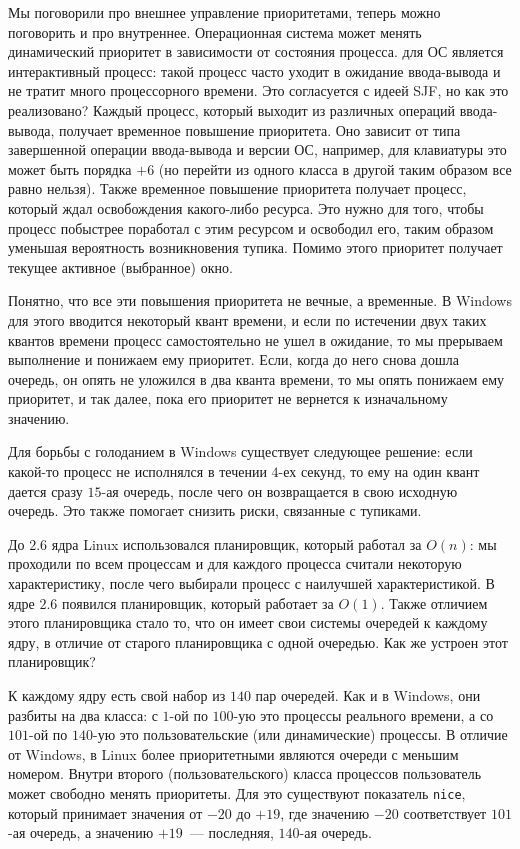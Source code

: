Мы поговорили про внешнее управление приоритетами, теперь можно поговорить и про
внутреннее. Операционная система может менять динамический приоритет в
зависимости от состояния процесса.  для ОС является интерактивный
процесс: такой процесс часто уходит в ожидание ввода-вывода и не тратит много
процессорного времени. Это согласуется с идеей SJF, но как это реализовано?
Каждый процесс, который выходит из различных операций ввода-вывода, получает
временное повышение приоритета. Оно зависит от типа завершенной операции
ввода-вывода и версии ОС, например, для клавиатуры это может быть порядка
\(+6\) (но перейти из одного класса в другой таким образом все равно нельзя).
Также временное повышение приоритета получает процесс, который ждал освобождения
какого-либо ресурса. Это нужно для того, чтобы процесс побыстрее поработал с
этим ресурсом и освободил его, таким образом уменьшая вероятность возникновения
тупика. Помимо этого приоритет получает текущее активное (выбранное) окно.

Понятно, что все эти повышения приоритета не вечные, а временные. В Windows для
этого вводится некоторый квант времени, и если по истечении двух таких квантов
времени процесс самостоятельно не ушел в ожидание, то мы прерываем выполнение и
понижаем ему приоритет. Если, когда до него снова дошла очередь, он опять не
уложился в два кванта времени, то мы опять понижаем ему приоритет, и так далее,
пока его приоритет не вернется к изначальному значению.

Для борьбы с голоданием в Windows существует следующее решение: если какой-то
процесс не исполнялся в течении \(4\)-ех секунд, то ему на один квант дается
сразу \(15\)-ая очередь, после чего он возвращается в свою исходную очередь. Это
также помогает снизить риски, связанные с тупиками.


До \(2.6\) ядра Linux использовался планировщик, который работал за \(O(n)\): мы
проходили по всем процессам и для каждого процесса считали некоторую
характеристику, после чего выбирали процесс с наилучшей характеристикой. В ядре
\(2.6\) появился планировщик, который работает за \(O(1)\). Также отличием этого
планировщика стало то, что он имеет свои системы очередей к каждому ядру, в
отличие от старого планировщика с одной очередью. Как же устроен этот
планировщик?

К каждому ядру есть свой набор из \(140\) пар очередей. Как и в Windows, они
разбиты на два класса: с \(1\)-ой по \(100\)-ую это процессы реального времени,
а со \(101\)-ой по \(140\)-ую это пользовательские (или динамические) процессы.
В отличие от Windows, в Linux более приоритетными являются очереди с меньшим
номером. Внутри второго (пользовательского) класса процессов пользователь может
свободно менять приоритеты. Для это существуют показатель \texttt{nice}, который
принимает значения от \(-20\) до \(+19\), где значению \(-20\) соответствует
\(101\)-ая очередь, а значению \(+19\)~--- последняя, \(140\)-ая очередь.

